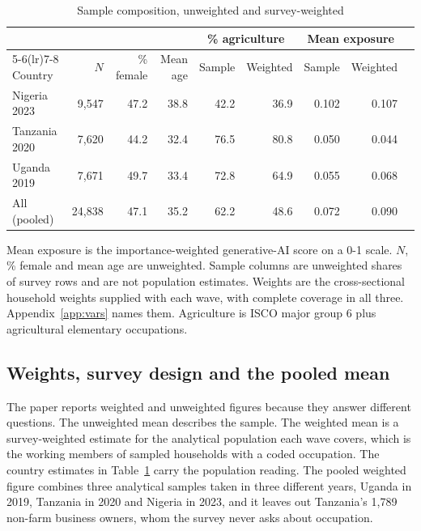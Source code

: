 \begin{table}[ht]
\centering
\caption{Sample composition, unweighted and survey-weighted}
\label{tab:summary}
\small
\begin{tabular}{lrrrrrrrr}
\toprule
 & & & & \multicolumn{2}{c}{\% agriculture} & \multicolumn{2}{c}{Mean exposure} \\
\cmidrule(lr){5-6}\cmidrule(lr){7-8}
Country & $N$ & \% female & Mean age & Sample & Weighted & Sample & Weighted \\
\midrule
Nigeria 2023  & 9{,}547  & 47.2 & 38.8 & 42.2 & 36.9 & 0.102 & 0.107 \\
Tanzania 2020 & 7{,}620  & 44.2 & 32.4 & 76.5 & 80.8 & 0.050 & 0.044 \\
Uganda 2019   & 7{,}671  & 49.7 & 33.4 & 72.8 & 64.9 & 0.055 & 0.068 \\
\midrule
All (pooled)  & 24{,}838 & 47.1 & 35.2 & 62.2 & 48.6 & 0.072 & 0.090 \\
\bottomrule
\end{tabular}

\vspace{4pt}
\begin{minipage}{0.92\linewidth}
\footnotesize
Mean exposure is the importance-weighted generative-AI score on a 0-1 scale.
$N$, \% female and mean age are unweighted. Sample
columns are unweighted shares of survey rows and are not population estimates.
Weights are the cross-sectional household weights supplied with each wave,
with complete coverage in all three. Appendix~\ref{app:vars} names them. Agriculture is
ISCO major group 6 plus agricultural elementary occupations.
\end{minipage}
\end{table}

\subsection{Weights, survey design and the pooled mean}

The paper reports weighted and unweighted figures because they answer different
questions. The unweighted mean describes the sample. The weighted mean is a
survey-weighted estimate for the analytical population each wave covers, which
is the working members of sampled households with a coded occupation. The
country estimates in Table~\ref{tab:summary} carry the population reading. The
pooled weighted figure combines three analytical samples taken in three
different years, Uganda in 2019, Tanzania in 2020 and Nigeria in 2023, and it
leaves out Tanzania's 1,789 non-farm business owners, whom the survey never
asks about occupation.

